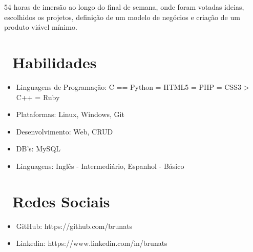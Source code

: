\documentclass{resume}
\begin{document}
54 horas de imersão ao longo do final de semana, onde foram votadas ideias, escolhidos os projetos, definição de um modelo de negócios e criação de um produto viável mínimo.

\section{\faCogs\ Habilidades}
\begin{itemize}[parsep=0.5ex]
  \item Linguagens de Programação: C == Python = HTML5 = PHP = CSS3 > C++ = Ruby
  \item Plataformas: Linux, Windows, Git
  \item Desenvolvimento: Web, CRUD
  \item DB's: MySQL
  \item Linguagens: Inglês - Intermediário, Espanhol - Básico
\end{itemize}

\section{\faInfo\ Redes Sociais}
\begin{itemize}[parsep=0.5ex]
  \item GitHub: https://github.com/brunats
  \item Linkedin: https://www.linkedin.com/in/brunats
\end{itemize}

%
%
\end{document}
